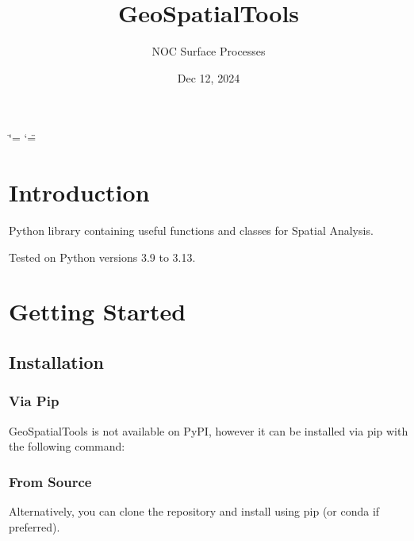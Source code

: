 \documentclass[letterpaper,10pt,english]{sphinxmanual}
\title{GeoSpatialTools}
\date{Dec 12, 2024}
\author{NOC Surface Processes}
\begin{document}
\ifdefined\shorthandoff
  \ifnum\catcode`\=\string=\active\shorthandoff{=}\fi
  \ifnum\catcode`\"=\active{}\fi
\fi

\pagestyle{empty}
\sphinxmaketitle
\pagestyle{plain}
\sphinxtableofcontents
\pagestyle{normal}
\label{\detokenize{index::doc}}


\sphinxstepscope


\chapter{Introduction}
\label{\detokenize{introduction:introduction}}\label{\detokenize{introduction::doc}}
\sphinxAtStartPar
Python library containing useful functions and classes for Spatial Analysis.

\sphinxAtStartPar
Tested on Python versions 3.9 to 3.13.

\sphinxstepscope


\chapter{Getting Started}
\label{\detokenize{getting_started:getting-started}}\label{\detokenize{getting_started::doc}}

\section{Installation}
\label{\detokenize{getting_started:installation}}

\subsection{Via Pip}
\label{\detokenize{getting_started:via-pip}}
\sphinxAtStartPar
GeoSpatialTools is not available on PyPI, however it can be installed via pip with the following command:

\begin{sphinxVerbatim}[commandchars=\\\{\}]
\end{sphinxVerbatim}


\subsection{From Source}
\label{\detokenize{getting_started:from-source}}
\sphinxAtStartPar
Alternatively, you can clone the repository and install using pip (or conda if preferred).
\end{document}
